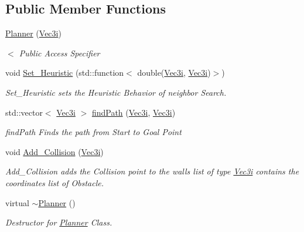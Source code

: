 \subsection*{Public Member Functions}
\begin{DoxyCompactItemize}
\item 
\hyperlink{classPlanner_a828c56000cd1c514992c3f5a66c360eb}{Planner} (\hyperlink{structVec3i}{Vec3i})
\begin{DoxyCompactList}\small\item\em $<$ Public Access Specifier \end{DoxyCompactList}\item 
void \hyperlink{classPlanner_aba883f3b06c9ec1f50ff3715379b9315}{Set\+\_\+\+Heuristic} (std\+::function$<$ double(\hyperlink{structVec3i}{Vec3i}, \hyperlink{structVec3i}{Vec3i})$>$)
\begin{DoxyCompactList}\small\item\em Set\+\_\+\+Heuristic sets the Heuristic Behavior of neighbor Search. \end{DoxyCompactList}\item 
std\+::vector$<$ \hyperlink{structVec3i}{Vec3i} $>$ \hyperlink{classPlanner_a9d37842d3e18a53eadd201f8f9571a12}{find\+Path} (\hyperlink{structVec3i}{Vec3i}, \hyperlink{structVec3i}{Vec3i})
\begin{DoxyCompactList}\small\item\em find\+Path Finds the path from Start to Goal Point \end{DoxyCompactList}\item 
void \hyperlink{classPlanner_af25e70e04bccfebde65b2d5092e61633}{Add\+\_\+\+Collision} (\hyperlink{structVec3i}{Vec3i})
\begin{DoxyCompactList}\small\item\em Add\+\_\+\+Collision adds the Collision point to the walls list  of type \hyperlink{structVec3i}{Vec3i} contains the coordinates list of Obstacle. \end{DoxyCompactList}\item 
virtual \hyperlink{classPlanner_ac3db7cf113ad368fa6fce636b6e94abe}{$\sim$\+Planner} ()
\begin{DoxyCompactList}\small\item\em Destructor for \hyperlink{classPlanner}{Planner} Class. \end{DoxyCompactList}\end{DoxyCompactItemize}
